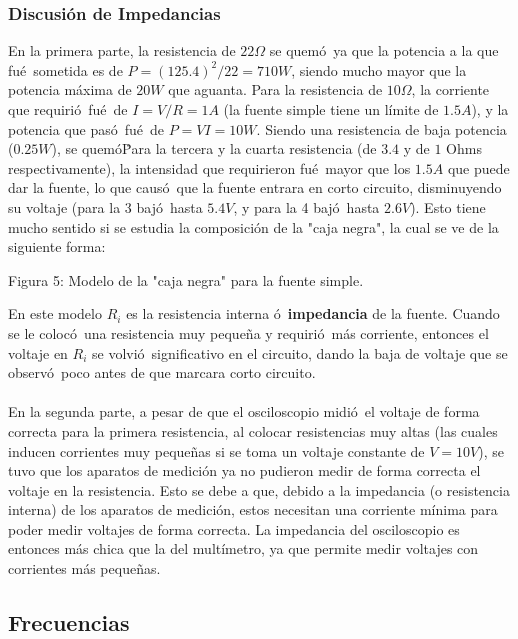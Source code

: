 \documentclass{article}
\begin{document}
\subsubsection{Discusi\'on de Impedancias}
En la primera parte, la resistencia de $22\Omega$ se quem\'o\ ya que la potencia a la que fu\'e\ sometida es de $P=(125.4)^2/22=710W$, siendo mucho mayor que la potencia m\'axima de $20W$ que aguanta. Para la resistencia de $10\Omega$, la corriente que requiri\'o\ fu\'e\ de $I=V/R=1A$ (la fuente simple tiene un l\'imite de $1.5A$), y la potencia que pas\'o\ fu\'e\ de $P=VI=10W$. Siendo una resistencia de baja potencia ($0.25W$), se quem\'o\. Para la tercera y la cuarta resistencia (de $3.4$ y de $1$ Ohms respectivamente), la intensidad que requirieron fu\'e\ mayor que los $1.5A$ que puede dar la fuente, lo que caus\'o\ que la fuente entrara en corto circuito, disminuyendo su voltaje (para la 3 baj\'o\ hasta $5.4V$, y para la 4 baj\'o\ hasta $2.6V$). Esto tiene mucho sentido si se estudia la composici\'on de la "caja negra", la cual se ve de la siguiente forma:
\vspace{5cm}

\begin{center}
Figura 5: Modelo de la "caja negra" para la fuente simple.
\end{center} 
En este modelo $R_i$ es la resistencia interna \'o\ \textbf{impedancia} de la fuente. Cuando se le coloc\'o\ una resistencia muy peque\~na y requiri\'o\ m\'as corriente, entonces el voltaje en $R_i$ se volvi\'o\ significativo en el circuito, dando la baja de voltaje que se observ\'o\ poco antes de que marcara corto circuito. \\ \\
En la segunda parte, a pesar de que el osciloscopio midi\'o\ el voltaje de forma correcta para la primera resistencia, al colocar resistencias muy altas (las cuales inducen corrientes muy peque\~nas si se toma un voltaje constante de $V=10V$), se tuvo que los aparatos de medici\'on ya no pudieron medir de forma correcta el voltaje en la resistencia. Esto se debe a que, debido a la impedancia (o resistencia interna) de los aparatos de medici\'on, estos necesitan una corriente m\'inima para poder medir voltajes de forma correcta. La impedancia del osciloscopio es entonces m\'as chica que la del mult\'imetro, ya que permite medir voltajes con corrientes m\'as peque\~nas.

\subsection{Frecuencias}
\end{document}
